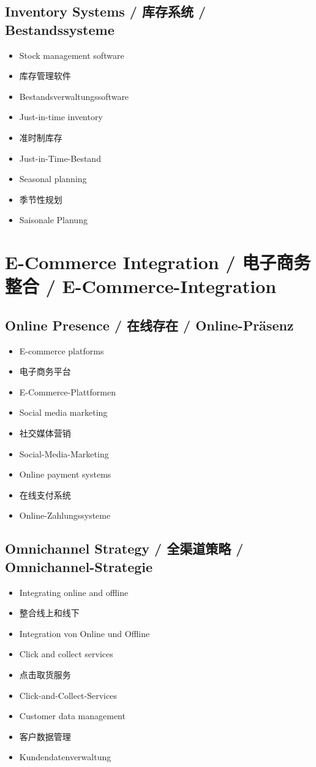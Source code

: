 \subsection{Inventory Systems / 库存系统 / Bestandssysteme}
\begin{itemize}
    \item Stock management software
    \item 库存管理软件
    \item Bestandsverwaltungssoftware
    \item Just-in-time inventory
    \item 准时制库存
    \item Just-in-Time-Bestand
    \item Seasonal planning
    \item 季节性规划
    \item Saisonale Planung
\end{itemize}

\section{E-Commerce Integration / 电子商务整合 / E-Commerce-Integration}

\subsection{Online Presence / 在线存在 / Online-Präsenz}
\begin{itemize}
    \item E-commerce platforms
    \item 电子商务平台
    \item E-Commerce-Plattformen
    \item Social media marketing
    \item 社交媒体营销
    \item Social-Media-Marketing
    \item Online payment systems
    \item 在线支付系统
    \item Online-Zahlungssysteme
\end{itemize}

\subsection{Omnichannel Strategy / 全渠道策略 / Omnichannel-Strategie}
\begin{itemize}
    \item Integrating online and offline
    \item 整合线上和线下
    \item Integration von Online und Offline
    \item Click and collect services
    \item 点击取货服务
    \item Click-and-Collect-Services
    \item Customer data management
    \item 客户数据管理
    \item Kundendatenverwaltung
\end{itemize}

